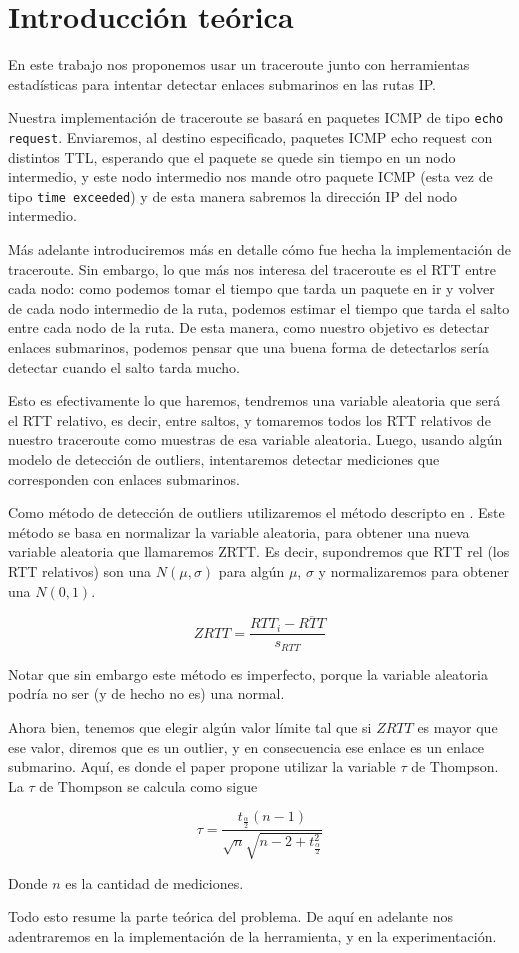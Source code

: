 \section{Introducci\'on te\'orica}

\PARstart En este trabajo nos proponemos usar un traceroute junto con herramientas estadísticas para intentar detectar enlaces submarinos en las rutas IP. 

Nuestra implementación de traceroute se basará en paquetes ICMP de tipo \texttt{echo request}. Enviaremos, al destino especificado, paquetes ICMP echo request con distintos TTL, esperando que el paquete se quede sin tiempo en un nodo intermedio, y este nodo intermedio nos mande otro paquete ICMP (esta vez de tipo \texttt{time exceeded}) y de esta manera sabremos la dirección IP del nodo intermedio.


Más adelante introduciremos más en detalle cómo fue hecha la implementación de traceroute. Sin embargo, lo que más nos interesa del traceroute es el RTT entre cada nodo: como podemos tomar el tiempo que tarda un paquete en ir y volver de cada nodo intermedio de la ruta, podemos estimar el tiempo que tarda el salto entre cada nodo de la ruta. De esta manera, como nuestro objetivo es detectar enlaces submarinos, podemos pensar que una buena forma de detectarlos sería detectar cuando el salto tarda mucho.

Esto es efectivamente lo que haremos, tendremos una variable aleatoria que será el RTT relativo, es decir, entre saltos, y tomaremos todos los RTT relativos de nuestro traceroute como muestras de esa variable aleatoria. Luego, usando algún modelo de detección de outliers, intentaremos detectar mediciones que corresponden con enlaces submarinos.

Como método de detección de outliers utilizaremos el método descripto en \cite{outliers}. Este método se basa en normalizar la variable aleatoria, para obtener una nueva variable aleatoria que llamaremos ZRTT. Es decir, supondremos que RTT rel (los RTT relativos) son una $N(\mu, \sigma)$ para algún $\mu$, $\sigma$ y normalizaremos para obtener una $N(0,1)$.

\[
  ZRTT = \frac{RTT_i - \overline{RTT}}{s_{RTT}}
\]

Notar que sin embargo este método es imperfecto, porque la variable aleatoria podría no ser (y de hecho no es) una normal.

Ahora bien, tenemos que elegir algún valor límite tal que si $ZRTT$ es mayor que ese valor, diremos que es un outlier, y en consecuencia ese enlace es un enlace submarino. Aquí, es donde el paper \cite{outliers} propone utilizar la variable $\tau$ de Thompson. La $\tau$ de Thompson se calcula como sigue

\[
  \tau = \frac{
                 t_{\frac{\alpha}{2}} (n-1)
              }{
                 \sqrt{n} \sqrt{n-2 + t_{\frac{\alpha}{2}}^2}
              }
\]

Donde $n$ es la cantidad de mediciones. 

Todo esto resume la parte teórica del problema. De aquí en adelante nos adentraremos en la implementación de la herramienta, y en la experimentación.




